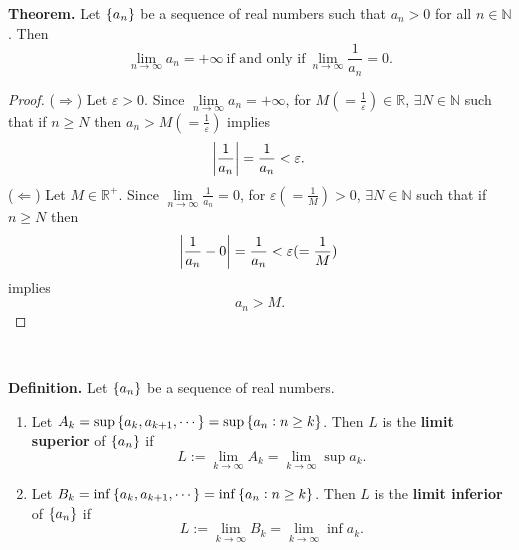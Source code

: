 \documentclass[12pt,a4paper]{article}
\newcommand{\dispsty}{\displaystyle}
\begin{document}
\begin{tcolorbox}[colback=white]
	\textbf{Theorem.} Let $\set{a_n}$ be a sequence of real numbers such that $a_n>0$ for all $n\in\mathbb{N}$. Then \[
	\lim\limits_{n\to\infty}a_n=+\infty\ \text{if and only if}\ \lim\limits_{n\to\infty}\frac{1}{a_n}=0.
	\]\tcblower\begin{proof}
		($\Rightarrow$) Let $\varepsilon>0$. Since $\lim\limits_{n\to\infty}a_n=+\infty$, for $M(=\dispsty\frac{1}{\varepsilon})\in\mathbb{R}$, $\exists N\in\mathbb{N}$ such that if $n\geq N$ then $a_n>M(=\dispsty\frac{1}{\varepsilon})$ implies \[
		\abs{\frac{1}{a_n}}=\frac{1}{a_n}<\varepsilon.
		\]
		($\Leftarrow$) Let $M\in\mathbb{R}^+$. Since $\lim\limits_{n\to\infty}\dispsty\frac{1}{a_n}=0$, for $\varepsilon(=\dispsty\frac{1}{M})>0$, $\exists N\in\mathbb{N}$ such that if $n\geq N$ then \[
		\dispsty\abs{\frac{1}{a_n}-0}=\frac{1}{a_n}<\varepsilon(=\frac{1}{M})
		\] implies \[
		a_n>M.
		\]
	\end{proof}
\end{tcolorbox}
\
\begin{tcolorbox}[colback=white]
	\textbf{Definition.} Let $\set{a_n}$ be a sequence of real numbers. \begin{enumerate}
		\item Let $A_k=\sup\set{a_k,a_{k+1},\cdots}=\sup\set{a_n:n\geq k}$. Then $L$ is the \textbf{limit superior} of $\set{a_n}$ if \[
		L:=\lim\limits_{k\to\infty}A_k=\lim\limits_{k\to\infty}\sup a_k.
		\]
		\item Let $B_k=\inf\set{a_k,a_{k+1},\cdots}=\inf\set{a_n:n\geq k}$. Then $L$ is the \textbf{limit inferior} of $\set{a_n}$ if \[
		L:=\lim\limits_{k\to\infty}B_k=\lim\limits_{k\to\infty}\inf a_k.
		\]
	\end{enumerate}
\end{tcolorbox}\
\newpage
\end{document}
